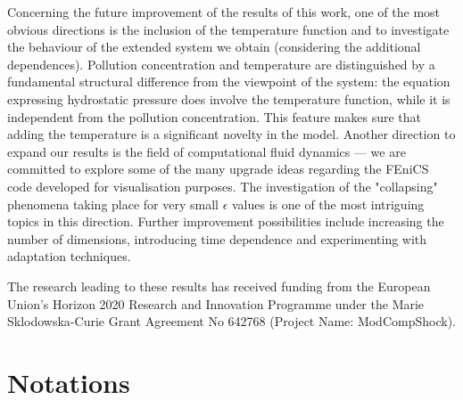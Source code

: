 \documentclass[12pt]{report}
\numberwithin{theorem}{chapter}
\numberwithin{corollary}{chapter}
\numberwithin{lemma}{chapter}
\numberwithin{remark}{chapter}
\numberwithin{definition}{chapter}
\numberwithin{prop}{chapter}
\begin{document}
Concerning the future improvement of the results of this work, one of the most obvious directions is the inclusion of the temperature function and to investigate the behaviour of the extended system we obtain (considering the additional dependences). Pollution concentration and temperature are distinguished by a fundamental structural difference from the viewpoint of the system: the equation expressing hydrostatic pressure does involve the temperature function, while it is independent from the pollution concentration. This feature makes sure that adding the temperature is a significant novelty in the model. Another direction to expand our results is the field of computational fluid dynamics --- we are committed to explore some of the many upgrade ideas regarding the FEniCS code developed for visualisation purposes. The investigation of the "collapsing" phenomena taking place for very small $\epsilon$ values is one of the most intriguing topics in this direction. Further improvement possibilities include increasing the number of dimensions, introducing time dependence and experimenting with adaptation techniques.
\smallskip

The research leading to these results has received funding from the European Union's Horizon 2020 Research and Innovation Programme under the Marie Sklodowska-Curie Grant Agreement No 642768 (Project Name: ModCompShock).

\chapter*{Notations}  \label{Notations}
\end{document}
